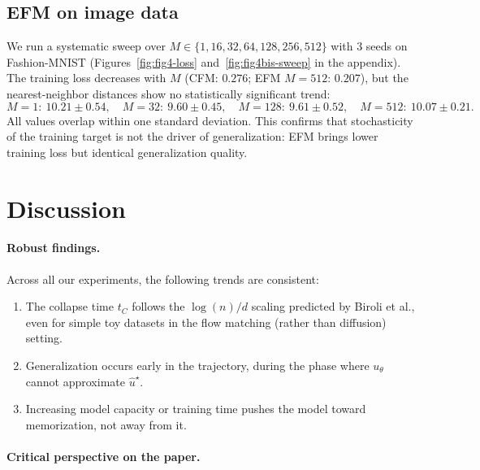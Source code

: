 \documentclass[10pt,a4paper]{article}
\theoremstyle{definition}
\begin{document}
\subsection{EFM on image data}\label{subsec:efm-images}

We run a systematic sweep over $M \in \{1, 16, 32, 64, 128, 256, 512\}$ with 3 seeds on Fashion-MNIST (Figures~\ref{fig:fig4-loss} and~\ref{fig:fig4bis-sweep} in the appendix).
The training loss decreases with $M$ (CFM: $0.276$; EFM $M{=}512$: $0.207$), but the nearest-neighbor distances show no statistically significant trend:
\[
M{=}1{:}\ 10.21\pm0.54,\quad M{=}32{:}\ 9.60\pm0.45,\quad M{=}128{:}\ 9.61\pm0.52,\quad M{=}512{:}\ 10.07\pm0.21.
\]
All values overlap within one standard deviation.
This confirms that stochasticity of the training target is not the driver of generalization: EFM brings lower training loss but identical generalization quality.

\section{Discussion}\label{sec:discussion}

\paragraph{Robust findings.}
Across all our experiments, the following trends are consistent:
\begin{enumerate}[nosep,leftmargin=1.5em]
    \item The collapse time $t_C$ follows the $\log(n)/d$ scaling predicted by Biroli et al., even for simple toy datasets in the flow matching (rather than diffusion) setting.
    \item Generalization occurs early in the trajectory, during the phase where $u_\theta$ cannot approximate $\hat{u}^\star$.
    \item Increasing model capacity or training time pushes the model toward memorization, not away from it.
\end{enumerate}

\paragraph{Critical perspective on the paper.}
\end{document}
